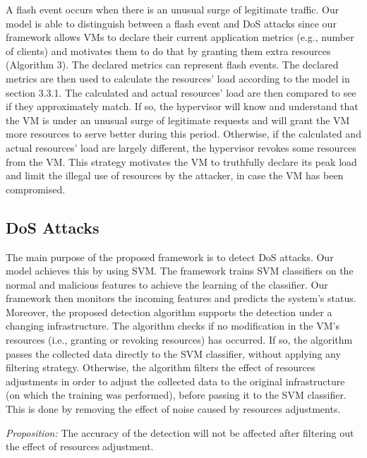\documentclass[twocolumn]{bmcart}%
\begin{document}
A flash event occurs when there is an unusual surge of legitimate traffic. Our model is able to distinguish  between a flash event and DoS attacks since our framework allows VMs to declare their current application metrics (e.g., number of clients) and motivates them to do that by granting them extra resources (Algorithm 3). The declared metrics can represent flash events. The declared metrics are then used to calculate the resources' load according to the model in section 3.3.1. The calculated and actual resources' load are then compared to see if they approximately match. If so, the hypervisor will know and understand that the VM is under an unusual surge of legitimate requests and will grant the VM more resources to serve better during this period. Otherwise, if the calculated and actual resources' load are largely different, the hypervisor revokes some resources from the VM. This strategy motivates the VM to truthfully declare its peak load and limit the illegal use of resources by the attacker, in case the VM has been compromised.

\subsection*{DoS Attacks}

The main purpose of the proposed framework is to detect DoS attacks. Our model achieves this by using SVM. The framework trains SVM classifiers on the normal and malicious features to achieve the learning of the classifier. Our framework then monitors the incoming features and predicts the system's status. Moreover, the proposed detection algorithm supports the detection under a changing infrastructure. The algorithm checks if no modification in the VM's resources (i.e., granting or revoking resources) has occurred. If so, the algorithm passes the collected data directly to the SVM classifier, without applying any filtering strategy. Otherwise, the algorithm filters the effect of resources adjustments in order to adjust the collected data to the original infrastructure (on which the training was performed), before passing it to the SVM classifier. This is done by removing the effect of noise caused by resources adjustments.

\emph{Proposition:} The accuracy of the detection will not be affected after filtering out the effect of resources adjustment.
\end{document}
